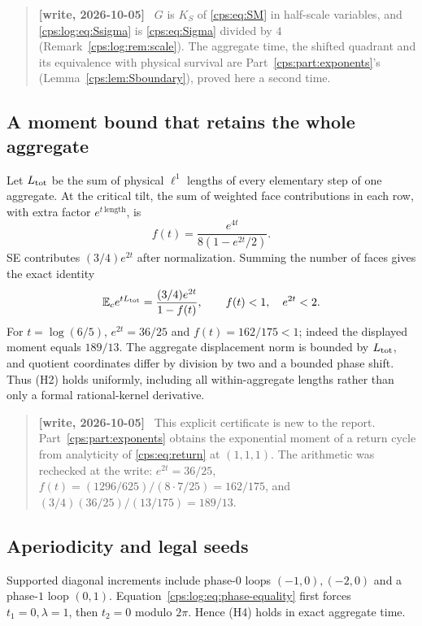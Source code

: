 \documentclass[11pt,letterpaper]{article}
\numberwithin{equation}{section}
\theoremstyle{remark}\newtheorem{remark}[theorem]{Remark}
\newcommand{\EE}{\mathbb E}
\newenvironment{writenotelog}{\begin{quote}\small\sloppy\textbf{[write, 2026-10-05]}\ }{\end{quote}}
\begin{document}
\begin{writenotelog}
$G$ is $K_S$ of \eqref{cps:eq:SM} in half-scale variables, and \eqref{cps:log:eq:Ssigma} is
\eqref{cps:eq:Sigma} divided by $4$ (Remark~\ref{cps:log:rem:scale}). The aggregate time, the
shifted quadrant and its equivalence with physical survival are Part~\ref{cps:part:exponents}'s
(Lemma~\ref{cps:lem:Sboundary}), proved here a second time.
\end{writenotelog}

\subsection{A moment bound that retains the whole aggregate}
Let $L_{\rm tot}$ be the sum of physical $\ell^1$ lengths of every
elementary step of one aggregate. At the critical tilt, the sum of
weighted face contributions in each row, with extra factor
$e^{t\,\text{length}}$, is
\[
 f(t)=\frac{e^{4t}}{8(1-e^{2t}/2)}.
\]
SE contributes $(3/4)e^{2t}$ after normalization. Summing the number
of faces gives the exact identity
\begin{equation}\label{cps:log:eq:Smoment}
 \EE_c e^{tL_{\rm tot}}=\frac{(3/4)e^{2t}}{1-f(t)},
 \qquad f(t)<1,\quad e^{2t}<2.
\end{equation}
For $t=\log(6/5)$, $e^{2t}=36/25$ and
$f(t)=162/175<1$; indeed the displayed moment equals $189/13$.
The aggregate displacement norm is bounded by $L_{\rm tot}$, and
quotient coordinates differ by division by two and a bounded phase
shift. Thus (H2) holds uniformly, including all within-aggregate
lengths rather than only a formal rational-kernel derivative.

\begin{writenotelog}
This explicit certificate is new to the report. Part~\ref{cps:part:exponents} obtains the
exponential moment of a return cycle from analyticity of \eqref{cps:eq:return} at $(1,1,1)$. The
arithmetic was rechecked at the write: $e^{2t}=36/25$, $f(t)=(1296/625)/(8\cdot7/25)=162/175$, and
$(3/4)(36/25)/(13/175)=189/13$.
\end{writenotelog}

\subsection{Aperiodicity and legal seeds}
Supported diagonal increments include phase-$0$ loops
$(-1,0),(-2,0)$ and a phase-$1$ loop $(0,1)$.
Equation~\eqref{cps:log:eq:phase-equality} first forces $t_1=0,\lambda=1$,
then $t_2=0$ modulo $2\pi$. Hence (H4) holds in exact aggregate time.
\end{document}
